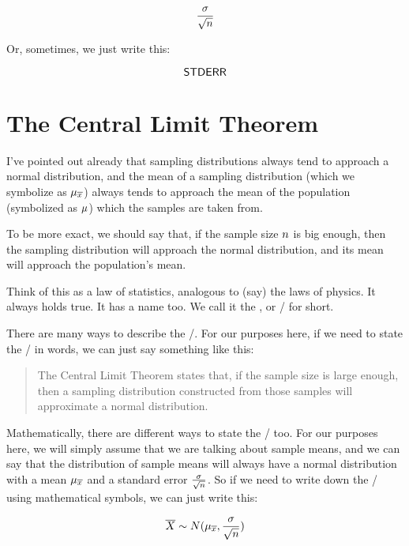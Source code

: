 \documentclass[../../../main.tex]{subfiles}
\begin{document}
\begin{equation*}
  \frac{\populationstdev}{\sqrt{\samplesize/}}
\end{equation*}

\noindent
Or, sometimes, we just write this:

\begin{equation*}
  \StdErr/
\end{equation*}

\section{The Central Limit Theorem}

I've pointed out already that sampling distributions always tend to approach a normal distribution, and the mean of a sampling distribution (which we symbolize as $\SamplingMean/$) always tends to approach the mean of the population (symbolized as $\mu$) which the samples are taken from.

To be more exact, we should say that, if the sample size $\samplesize/$ is big enough, then the sampling distribution will approach the normal distribution, and its mean will approach the population's mean.

Think of this as a law of statistics, analogous to (say) the laws of physics. It always holds true. It has a name too. We call it the , or \CLT/ for short. 

There are many ways to describe the \CLT/. For our purposes here, if we need to state the \CLT/ in words, we can just say something like this:

\begin{quote}
  The Central Limit Theorem states that, if the sample size is large enough, then a sampling distribution constructed from those samples will approximate a normal distribution.
\end{quote}

\noindent
Mathematically, there are different ways to state the \CLT/ too. For our purposes here, we will simply assume that we are talking about sample means, and we can say that the distribution of sample means will always have a normal distribution with a mean $\SamplingMean/$ and a standard error $\frac{\populationstdev}{\sqrt{\samplesize/}}$. So if we need to write down the \CLT/ using mathematical symbols, we can just write this:

\begin{equation*}
  \SamplingRandVar/ \sim N(\SamplingMean/, \frac{\populationstdev}{\sqrt{\samplesize/}})
\end{equation*}
\end{document}
